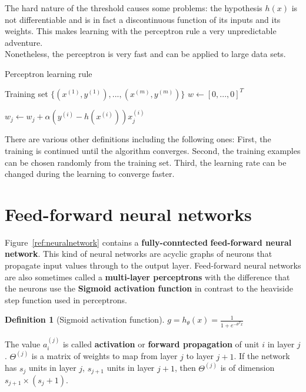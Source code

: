 \documentclass{report}
\newtheorem{definition}{Definition}[section]
\begin{document}
The hard nature of the threshold causes some problems: the hypothesis $h(x)$ is not differentiable and is in fact a discontinuous function of its inputs and its weights. This makes learning with the perceptron rule a very unpredictable adventure. \\
Nonetheless, the perceptron is very fast and can be applied to large data sets.

\begin{algorithm}[h!]
\caption{Perceptron learning rule}
\label{alg:perceptron}
\begin{algorithmic}
\State Training set $\{(x^{(1)},y^{(1)}),...,(x^{(m)},y^{(m)})\}$
\State $w \gets [0,...,0]^T$ 

\State $w_j \gets w_j + \alpha(y^{(i)} - h(x^{(i)})) x^{(i)}_j$ 
\EndFor

\end{algorithmic}
\end{algorithm}

There are various other definitions including the following ones:
First, the training is continued until the algorithm converges.
Second, the training examples can be chosen randomly from the training set.
Third, the learning rate can be changed during the learning to converge faster.


\section{Feed-forward neural networks}
Figure~\ref{ref:neuralnetwork} contains a {\bf fully-conntected} {\bf feed-forward neural network}.
This kind of neural networks are acyclic graphs of neurons that propagate input values through to the output layer.
Feed-forward neural networks are also sometimes called a {\bf multi-layer perceptrons} with the difference that the neurons use the {\bf Sigmoid activation function} in contrast to the heaviside step function used in perceptrons.

\begin{definition}[Sigmoid activation function]
$g = h_\theta(x) = \frac{1}{1+e^{-\theta^{T}x}}$
\end{definition}

The value $a_i^{(j)}$ is called {\bf activation} or {\bf forward propagation} of unit $i$ in layer $j$.
$\Theta^{(j)}$ is a matrix of weights to map from layer $j$ to layer $j+1$.
If the network has $s_j$ units in layer $j$, $s_{j+1}$ units in layer $j+1$, then $\Theta^{(j)}$ is of dimension $s_{j+1}\times (s_j + 1)$. \\
\end{document}
